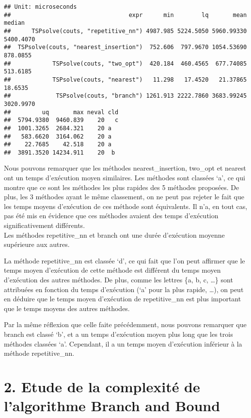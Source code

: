 \documentclass[
]{article}
\begin{document}
\begin{verbatim}
## Unit: microseconds
##                                  expr      min        lq       mean    median
##      TSPsolve(couts, "repetitive_nn") 4987.985 5224.5050 5960.99330 5400.4070
##  TSPsolve(couts, "nearest_insertion")  752.606  797.9670 1054.53690  878.0855
##            TSPsolve(couts, "two_opt")  420.184  460.4565  677.74085  513.6185
##            TSPsolve(couts, "nearest")   11.298   17.4520   21.37865   18.6535
##             TSPsolve(couts, "branch") 1261.913 2222.7860 3683.99245 3020.9970
##         uq       max neval cld
##  5794.9380  9460.839    20   c
##  1001.3265  2684.321    20 a  
##   583.6620  3164.062    20 a  
##    22.7685    42.518    20 a  
##  3891.3520 14234.911    20  b
\end{verbatim}

Nous pouvons remarquer que les méthodes nearest\_insertion, two\_opt et
nearest ont un temps d'exécution moyen similaires. Les méthodes sont
classées `a', ce qui montre que ce sont les méthodes les plus rapides
des 5 méthodes proposées. De plus, les 3 méthodes ayant le même
classement, on ne peut pas rejeter le fait que les temps moyens
d'exécution de ces méthode sont équivalents. Il n'a, en tout cas, pas
été mis en évidence que ces méthodes avaient des temps d'exécution
significativement différents.\\
Les méthodes repetitive\_nn et branch ont une durée d'exécution moyenne
supérieure aux autres.

La méthode repetitive\_nn est classée `d', ce qui fait que l'on peut
affirmer que le temps moyen d'exécution de cette méthode est différent
du temps moyen d'exécution des autres méthodes. De plus, comme les
lettres \{a, b, c, \ldots\} sont attribuées en fonction du temps
d'exécution (`a' pour la plus rapide, \ldots), on peut en déduire que le
temps moyen d'exécution de repetitive\_nn est plus important que le
temps moyens des autres méthodes.

Par la même réflexion que celle faite précédemment, nous pouvons
remarquer que branch est classé `b', et a un temps d'exécution moyen
plus long que les trois méthodes classées `a'. Cependant, il a un temps
moyen d'exécution inférieur à la méthode repetitive\_nn.~

\hypertarget{etude-de-la-complexituxe9-de-lalgorithme-branch-and-bound}{%
\section{2. Etude de la complexité de l'algorithme Branch and
Bound}\label{etude-de-la-complexituxe9-de-lalgorithme-branch-and-bound}}
\end{document}
